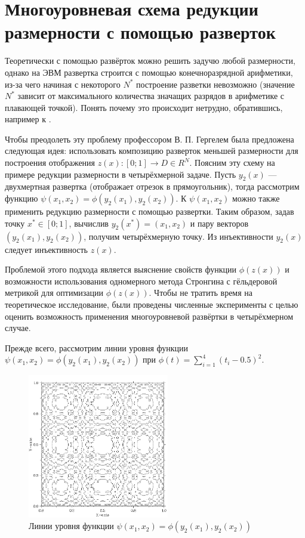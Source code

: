 \section{Многоуровневая схема редукции размерности с помощью разверток}
\label{sec:multilev_maps}
Теоретически с помощью развёрток можно решить задучю любой размерности, однако на ЭВМ развертка строится с помощью конечноразрядной арифметики, из-за чего начиная с некоторого \(N^*\)
построение разветки невозможно (значение \(N^*\) зависит от максимального количества значащих разрядов в арифметике с плавающей точкой).
Понять почему это происходит нетрудно, обратившись, например к \cite{strOptBook}.
\par
Чтобы преодолеть эту проблему профессором В. П. Гергелем была предложена следующая идея: использовать композицию разверток меньшей размерности для построения отображения
\(z(x): [0;1] \rightarrow D \in R^N\).
Поясним эту схему на примере редукции размерности в четырёхмерной задаче. Пусть \(y_2(x)\) --- двухмертная развертка (отображает отрезок в прямоугольник), тогда рассмотрим функцию
\(\psi(x_1,x_2)=\phi(y_2(x_1), y_2(x_2))\). К \(\psi(x_1,x_2)\) можно также применить редукцию размерности с помощью развертки. Таким образом, задав точку \(x^*\in [0;1]\),
вычислив \(y_2(x^*)=(x_1,x_2)\) и пару векторов \((y_2(x_1), y_2(x_2))\), получим четырёхмерную точку. Из инъективности \(y_2(x)\) следует инъективность \(z(x)\).
\par
Проблемой этого подхода является выяснение свойств функции \(\phi(z(x))\) и возможности использования одномерного метода Стронгина с гёльдеровой метрикой для оптимизации \(\phi(z(x))\).
Чтобы не тратить время на теоретическое исследование, были проведены численные эксперименты с целью оценить возможность применения многоуровневой развёртки в четырёхмерном случае.
\par
Прежде всего, рассмотрим линии уровня функции \(\psi(x_1,x_2)=\phi(y_2(x_1), y_2(x_2))\) при \(\phi(t)=\sum_{i=1}^{4}(t_i-0.5)^2\).
\begin{figure}[ht]
	\center
  \includegraphics[width=0.55\textwidth]{pictures/multimap_isolines.png}
  \caption{Линии уровня функции \(\psi(x_1,x_2)=\phi(y_2(x_1), y_2(x_2))\)}
  \label{fig:1}
\end{figure}
